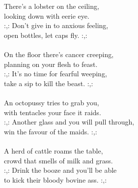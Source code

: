 
There's a lobster on the ceiling, \\ looking down with eerie eye. \\ :,: Don't give in to anxious feeling, \\ open bottles, let caps fly. :,: \\ \hspace{10mm} \\ On the floor there's cancer creeping, \\ planning on your flesh to feast. \\ :,: It's no time for fearful weeping, \\ take a sip to kill the beast. :,: \\ \hspace{10mm} \\ An octopussy tries to grab you, \\ with tentacles your face it raids. \\ :,: Another glass and you will pull through, \\ win the favour of the maids. :,: \\ \hspace{10mm} \\ A herd of cattle roams the table, \\ crowd that smells of milk and grass. \\ :,: Drink the booze and you'll be able \\ to kick their bloody bovine ass. :,: